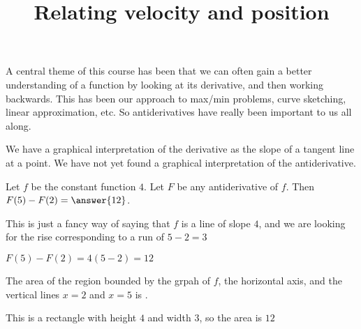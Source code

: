 \documentclass{ximera}
\title[Dig-In:]{Relating velocity and position}
\begin{document}
A central theme of this course has been that we can often gain a
better understanding of a function by looking at its derivative, and
then working backwards.  This has been our approach to max/min
problems, curve sketching, linear approximation, etc.  So
antiderivatives have really been important to us all along.

We have a graphical interpretation of the derivative as the slope of a
tangent line at a point.  We have not yet found a graphical
interpretation of the antiderivative.

  \begin{question}
   Let $f$ be the constant function $4$. Let $F$ be any antiderivative
   of $f$.  Then $F(5)-F(2) = \answer{12}$.
   \begin{hint}
    This is just a fancy way of saying that $f$ is a line of slope
    $4$, and we are looking for the rise corresponding to a run of
    $5-2= 3$
   \end{hint}
   \begin{hint}
    $F(5) - F(2) = 4(5-2) = 12$
   \end{hint}
  \end{question}
  
  \begin{question}
    The area of the region bounded by the grpah of $f$, the horizontal
    axis, and the vertical lines $x=2$ and $x=5$ is .
    
    \begin{hint}
      \begin{image}
\end{image}
    \end{hint}
    \begin{hint}
      This is a rectangle with height $4$ and width $3$, so the area is $12$
    \end{hint}
  \end{question}
\end{document}
